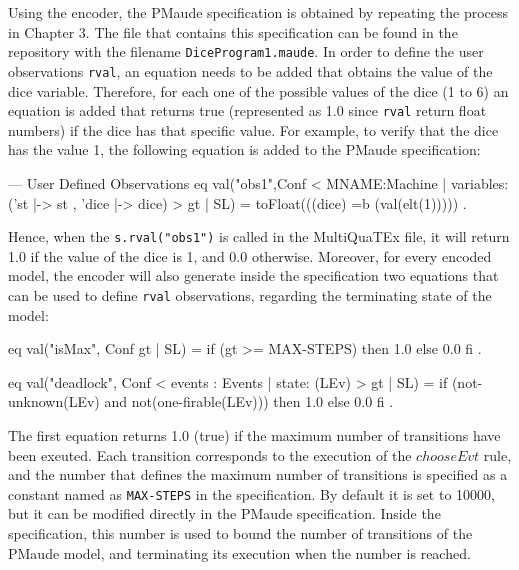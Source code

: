 Using the encoder, the PMaude specification is obtained by repeating the process in Chapter 3. The file that contains this specification can be found in the repository with the filename \texttt{DiceProgram1.maude}. In order to define the user observations \texttt{rval}, an equation needs to be added that obtains the value of the dice variable. Therefore, for each one of the possible values of the dice (1 to 6) an equation is added that returns true (represented as 1.0 since \texttt{rval} return float numbers) if the dice has that specific value. For example, to verify that the dice has the value 1, the following equation is added to the PMaude specification:
\begin{maude}

  --- User Defined Observations 
eq val("obs1",{Conf < MNAME:Machine | 
                    variables:('st |-> st , 'dice |-> dice) >} 
                    {gt | SL}) 
                    = toFloat(((dice) =b (val(elt(1))))) .
\end{maude}
Hence, when the \texttt{s.rval("obs1")} is called in the MultiQuaTEx file, it will return 1.0 if the value of the dice is 1, and 0.0 otherwise. Moreover, for every encoded model, the encoder will also generate inside the specification two equations that can be used to define \texttt{rval} observations, regarding the terminating state of the model:
\begin{maude}

eq val("isMax", {Conf} {gt | SL}) = if (gt >= MAX-STEPS) 
                                    then 1.0 
                                    else 0.0 fi .

 eq val("deadlock", {Conf < events : Events | state: (LEv) >} 
                    {gt | SL}) = if (not-unknown(LEv) and 
                                    not(one-firable(LEv))) 
                                 then 1.0 
                                 else 0.0 fi .
\end{maude}
The first equation returns 1.0 (true) if the maximum number of transitions have been exeuted. Each transition corresponds to the execution of the $chooseEvt$ rule, and the number that defines the maximum number of transitions is specified as a constant named as \texttt{MAX-STEPS} in the specification. By default it is set to 10000, but it can be modified directly in the PMaude specification. Inside the specification, this number is used to bound the number of transitions of the PMaude model, and terminating its execution when the number is reached.

